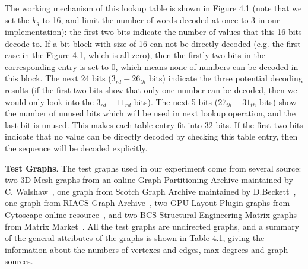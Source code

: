 \documentclass[12pt,glossary]{dalthesis}
\begin{document}
\bigskip

The working mechanism of this lookup table is shown in Figure 4.1 (note that we set the $k_{g}$ to 16, and limit the number of words decoded at once to 3 in our implementation): the first two bits indicate the number of values that this 16 bits decode to. If a bit block with size of 16 can not be directly decoded (e.g. the first case in the Figure 4.1, which is all zero), then the firstly two bits in the corresponding entry is set to 0, which means none of numbers can be decoded in this block. The next 24 bits ($3_{rd} - 26_{th}$ bits) indicate the three potential decoding results (if the first two bits show that only one number can be decoded, then we would only look into the $3_{rd} - 11_{rd}$ bits). The next 5 bits ($27_{th} - 31_{th}$ bits) show the number of unused bits which will be used in next lookup operation, and the last bit is unused. This makes each table entry fit into 32 bits. If the first two bits indicate that no value can be directly decoded by checking this table entry, then the sequence will be decoded explicitly.

\textbf{Test Graphs}. The test graphs used in our experiment come from several source: two 3D Mesh graphs from an online Graph Partitioning Archive maintained by C. Walshaw~\cite{3DMESH}, one graph from Scotch Graph Archive maintained by D.Beckett~\cite{Scotch}, one graph from RIACS Graph Archive~\cite{RIACS}, two GPU Layout Plugin graphs from Cytoscape online resource~\cite{Cytoscape}, and two BCS Structural Engineering Matrix graphs from Matrix Market~\cite{Matrix}. All the test graphs are undirected graphs, and a summary of the general attributes of the graphs is shown in Table 4.1, giving the information about the numbers of vertexes and edges, max degrees and graph sources.
\end{document}
